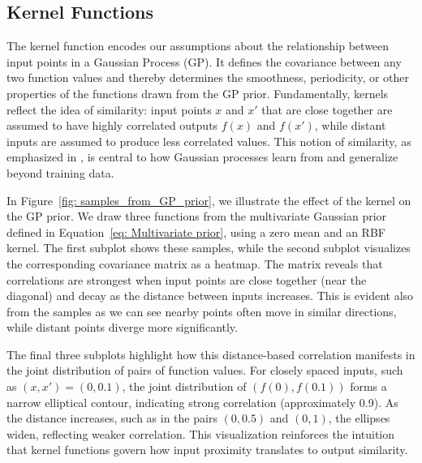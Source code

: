 \documentclass[10pt]{article}
\begin{document}
\subsection{Kernel Functions}
\label{sec: Kernels}
The kernel function encodes our assumptions about the relationship between input points in a Gaussian Process (GP).
It defines the covariance between any two function values and thereby determines the smoothness, periodicity, or other properties of the functions drawn from the GP prior.
Fundamentally, kernels reflect the idea of similarity: input points \( x \) and \( x' \) that are close together are assumed to have highly correlated outputs \( f(x) \) and \( f(x') \),
while distant inputs are assumed to produce less correlated values. This notion of similarity, as emphasized in \cite[p.~79]{bible}, is central to how Gaussian processes learn from and generalize beyond training data.

\vspace{1em}
\noindent
In Figure~\ref{fig: samples_from_GP_prior}, we illustrate the effect of the kernel on the GP prior.
We draw three functions from the multivariate Gaussian prior defined in Equation~\ref{eq: Multivariate prior}, using a zero mean and an RBF kernel.
The first subplot shows these samples, while the second subplot visualizes the corresponding covariance matrix as a heatmap.
The matrix reveals that correlations are strongest when input points are close together (near the diagonal) and decay as the distance between inputs increases.
This is evident also from the samples as we can see nearby points often move in similar directions, while distant points diverge more significantly.

\vspace{1em}
\noindent
The final three subplots highlight how this distance-based correlation manifests in the joint distribution of pairs of function values.
For closely spaced inputs, such as \( (x, x') = (0, 0.1) \), the joint distribution of \( (f(0), f(0.1)) \) forms a narrow elliptical contour,
indicating strong correlation (approximately 0.9). As the distance increases, such as in the pairs \( (0, 0.5) \) and \( (0, 1) \), the ellipses widen, reflecting weaker correlation. This visualization reinforces the intuition that kernel functions govern how input proximity translates to output similarity.
\end{document}
